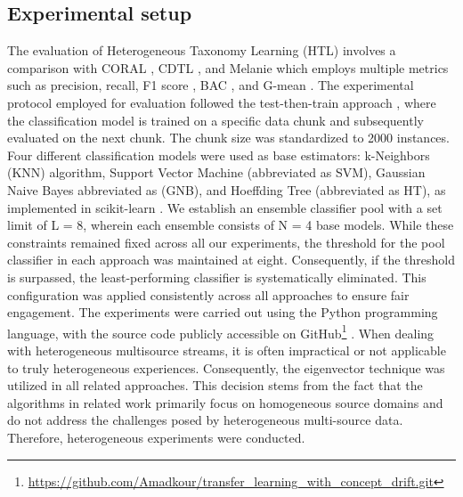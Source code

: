 \subsection{Experimental setup}
The evaluation of Heterogeneous Taxonomy Learning (HTL) involves a comparison with CORAL \cite{sun2016return}, CDTL \cite{yang2021concept}, and Melanie \cite{dong2019multistream}  which employs multiple metrics such as precision, recall, F1 score \cite{sasaki2007truth}, BAC \cite{brodersen2010balanced}, and G-mean \cite{kubat1997addressing}. The experimental protocol employed for evaluation followed the test-then-train approach \cite{krawczyk2017ensemble}, where the classification model is trained on a specific data chunk and subsequently evaluated on the next chunk. The chunk size was standardized to 2000 instances. Four different classification models were used as base estimators: k-Neighbors (KNN) algorithm, Support Vector Machine (abbreviated as SVM), Gaussian Naive Bayes abbreviated as (GNB), and Hoeffding Tree (abbreviated as HT), as implemented in scikit-learn \cite{frias2014online}. We establish an ensemble classifier pool with a set limit of L = 8, wherein each ensemble consists of N = 4 base models. While these constraints remained fixed across all our experiments, the threshold for the pool classifier in each approach was maintained at eight. Consequently, if the threshold is surpassed, the least-performing classifier is systematically eliminated. This configuration was applied consistently across all approaches to ensure fair engagement. The experiments were carried out using the Python programming language, with the source code publicly accessible on GitHub\footnote{\url{https://github.com/Amadkour/transfer_learning_with_concept_drift.git}} . When dealing with heterogeneous multisource streams, it is often impractical or not applicable to truly heterogeneous experiences. Consequently, the eigenvector technique was utilized in all related approaches. This decision stems from the fact that the algorithms in related work primarily focus on homogeneous source domains and do not address the challenges posed by heterogeneous multi-source data. Therefore, heterogeneous experiments were conducted.

